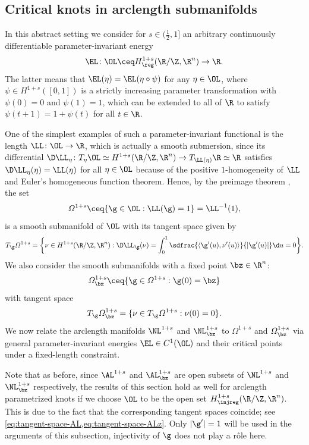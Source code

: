 \subsection{Critical knots in arclength submanifolds}\label{sec:AL-critical}
In this abstract setting we consider for $s\in (\frac{1}{2},1]$  
an arbitrary  continuously differentiable parameter-invariant
energy 
$$
\EL \colon \OL \ceq H^{1+s}_\reg(\R/\Z,\R^n)\to\R.
$$
The latter means that 
$\EL(\eta)=\EL(\eta\circ\psi)$ for any $\eta\in\OL$,
where $\psi\in H^{1+s}([0,1])$ is a
strictly increasing parameter transformation with $\psi(0)=0$ and $\psi(1)=1$,
which can be extended to all of $\R$ to satisfy $\psi(t+1)=1+\psi(t)$
for all $t\in\R$.  

One of the simplest examples of such a parameter-invariant functional is the
length $\LL \colon \OL\to\R$, which is actually a smooth submersion, since its differential
$\D\LL_\eta\colon T_\eta\OL\simeq H^{1+s}(\R/\Z,\R^n)\to T_{\LL(\eta)}\R\simeq\R$
satisfies $\D\LL_\eta(\eta)=\LL(\eta)$ for all $\eta\in\OL$ because of the 
positive
$1$-homogeneity of $\LL$ and Euler's homogeneous function 
theorem. 
Hence, by the preimage theorem \cite[Theorem 4.J]{zeidler_1993}, the set
\begin{equation}\label{eq:Omega-s}
\varOmega^{1+s}\ceq\{\g\in\OL:\LL(\g)=1\}=\LL^{-1}(1),
\end{equation}
is a smooth submanifold of $\OL$
with its tangent space given by
\begin{equation}\label{eq:TgOmega-s}
	T_\g\varOmega^{1+s}
	=
	\bigg\{
		\nu\in H^{1+s}(\R/\Z,\R^n) 
		: 
		\D\LL_\g(\nu)=\int_0^1\sdfrac{\langle\g'(u),\nu'(u)\rangle}{|\g'(u)|}\d u=0
	\bigg\}.
\end{equation}
We also consider the smooth submanifolds with a fixed point $\bz\in\R^n$:
\begin{equation}\label{eq:Omega-sz}
\varOmega^{1+s}_\bz\ceq\{\g\in\varOmega^{1+s}:\g(0)=\bz\}
\end{equation}
with tangent space
\begin{equation}\label{eq:TgOmega-sz}
T_\g\varOmega^{1+s}_\bz=\{\nu\in T_\g\varOmega^{1+s}:\nu(0)=0\}.
\end{equation}
We now relate the arclength manifolds $\NL^{1+s}$ and $\NL^{1+s}_{\bz}$ 
to $\varOmega^{1+s}$ and
$\varOmega^{1+s}_{\bz}$ via general parameter-invariant energies $\EL\in C^1(\OL)$
and their critical points under a fixed-length constraint.

Note that as before, since $ \AL^{1+s} $ and $ \AL^{1+s}_{\bz} $ are open subsets of $ \NL^{1+s} $ and $ \NL_{\bz}^{1+s} $ respectively, the results of this section hold as well for arclength parametrized knots if we choose $ \OL$ to be the open set $ H^{1+s}_{\injreg}(\R/\Z,\R^n) $. This is due to the fact that the corresponding tangent spaces coincide; see \cref{eq:tangent-space-AL,eq:tangent-space-ALz}.
Only $|\g'|=1$ will be used in the arguments of this subsection, injectivity of $\g$ does not play a r{\^o}le here.

